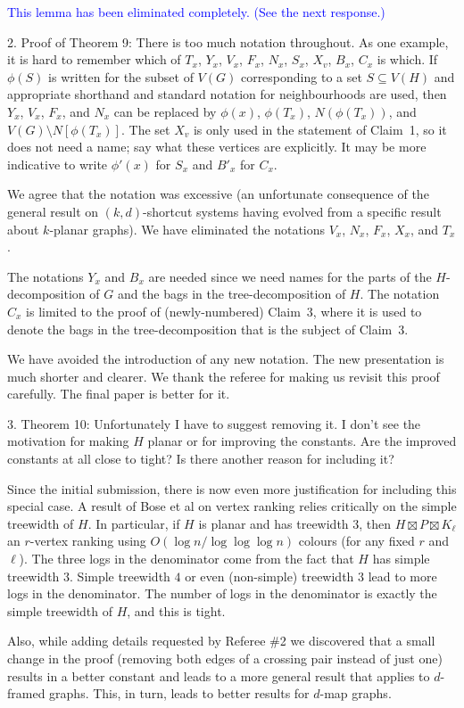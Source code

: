 \documentclass[12pt]{article}
\newenvironment{response}{\color{blue}}{}
\begin{document}
\textcolor{blue}{This lemma has been eliminated completely. (See the next response.)}

2. Proof of Theorem 9: There is too much notation throughout. As
one example, it is hard to remember which of $T_x$, $Y_x$, $V_x$, $F_x$, $N_x$,
$S_x$, $X_v$, $B_x$, $C_x$ is which. If $\phi(S)$ is written for the subset of $V(G)$
corresponding to a set $S \subseteq V(H)$ and appropriate shorthand and
standard notation for neighbourhoods are used, then $Y_x$, $V_x$, $F_x$, and
$N_x$ can be replaced by $\phi(x)$, $\phi(T_x)$, $N(\phi(T_x))$, and $V(G) \setminus N[\phi(T_x)]$.
The set $X_v$ is only used in the statement of Claim~1, so it does not
need a name; say what these vertices are explicitly. It may be more
indicative to write $\phi'(x)$ for $S_x$ and $B'_x$ for $C_x$.

\begin{response}
  We agree that the notation was excessive (an unfortunate consequence of the general result on $(k,d)$-shortcut systems having evolved from a specific result about $k$-planar graphs).  We have eliminated the notations $V_x$, $N_x$, $F_x$, $X_x$, and $T_x$.

  The notations $Y_x$ and $B_x$ are needed since we need names for the parts of the $H$-decomposition of $G$ and the bags in the tree-decomposition of $H$.    The notation $C_x$ is limited to the proof of (newly-numbered) Claim~3, where it is used to denote the bags in the tree-decomposition that is the subject of Claim~3.

  We have avoided the introduction of any new notation.  The new presentation is much shorter and clearer.  We thank the referee for making us revisit this proof carefully.  The final paper is better for it.
\end{response}

3. Theorem 10: Unfortunately I have to suggest removing it. I don’t see
the motivation for making $H$ planar or for improving the constants.
Are the improved constants at all close to tight? Is there another
reason for including it?

\begin{response}
  Since the initial submission, there is now even more justification for including this special case.  A result of Bose et al on vertex ranking relies critically on the simple treewidth of $H$.  In particular, if $H$ is planar and has treewidth $3$, then $H\boxtimes P\boxtimes K_\ell$ an $r$-vertex ranking using $O(\log n/\log\log\log n)$ colours (for any fixed $r$ and $\ell$).  The three logs in the denominator come from the fact that $H$ has simple treewidth $3$.  Simple treewidth $4$ or even (non-simple) treewidth $3$ lead to more logs in the denominator.  The number of logs in the denominator is exactly the simple treewidth of $H$, and this is tight.
  
  Also, while adding details requested by Referee \#2 we discovered that a small change in the proof (removing both edges of a crossing pair instead of just one) results in a better constant and leads to a more general result that applies to $d$-framed graphs. This, in turn, leads to better results for $d$-map graphs.
\end{response}
\end{document}
